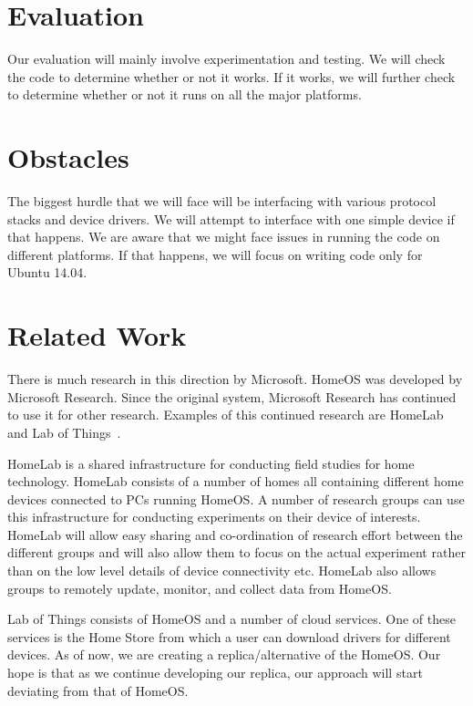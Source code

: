 \documentclass[letterpaper,12pt]{article}
\begin{document}
\section{Evaluation}
Our evaluation will mainly involve experimentation and testing. We will check the code to determine whether or not it works. If it works, we will further check to determine whether or not it runs on all the major platforms.

\section{Obstacles}
The biggest hurdle that we will face will be interfacing with various protocol stacks and device drivers. We will attempt to interface with one simple device if that happens. We are aware that we might face issues in running the code on different platforms. If that happens, we will focus on writing code only for Ubuntu 14.04.

\section{Related Work}
There is much research in this direction by Microsoft.  HomeOS was developed by Microsoft Research.  Since the original system, Microsoft Research has continued to use it for other research. Examples of this continued research are HomeLab~\cite{homeLab} and Lab of Things~\cite{labOfThings}.

HomeLab is a shared infrastructure for conducting field studies for home technology. HomeLab consists of a number of homes all containing different home devices connected to PCs running HomeOS. A number of research groups can use this infrastructure for conducting experiments on their device of interests. HomeLab will allow easy sharing and co-ordination of research effort between the different groups and will also allow them to focus on the actual experiment rather than on the low level details of device connectivity etc. HomeLab also allows groups to remotely update, monitor, and collect data from HomeOS.

Lab of Things consists of HomeOS and a number of cloud services. One of these services is the Home Store from which a user can download drivers for different devices. As of now, we are creating a replica/alternative of the HomeOS. Our hope is that as we continue developing our replica, our approach will start deviating from that of HomeOS.
\end{document}
